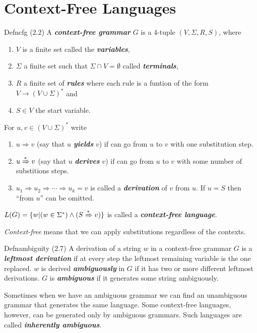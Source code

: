 \chapter{Context-Free Languages}

\begin{reference}{Defn}{cfg}
  (2.2) A \textbf{\textit{context-free grammar}} $G$ is a 4-tuple $(V,\Sigma,R,S)$, where
  \begin{enumerate}
    \item $V$ is a finite set called the \textbf{\textit{variables}},
    \item $\Sigma$ a finite set such that $\Sigma\cap V=\emptyset$ called \textbf{\textit{terminals}},
    \item $R$ a finite set of \textbf{\textit{rules}} where each rule is a funtion of the form $V\rightarrow (V\cup \Sigma)^*$ and
    \item $S\in V$ the start variable.
  \end{enumerate}
  For $u,v\in(V\cup\Sigma)^*$ write
  \begin{enumerate}
    \item $u\Rightarrow v$ (say that $u$ \textbf{\textit{yields}} $v$) if can go from $u$ to $v$ with one substitution step.
    \item $u\xRightarrow{*}v$ (say that $u$ \textbf{\textit{derives}} $v$) if can go from $u$ to $v$ with some number of substitions steps.
    \item $u_1\Rightarrow u_2\Rightarrow\cdots\Rightarrow u_k=v$ is called a \textbf{\textit{derivation}} of $v$ from $u$. If $u=S$ then ``from $u$'' can be omitted.
  \end{enumerate}
  $L(G)=\{w|(w\in \Sigma^*)\wedge (S\xRightarrow{*}v)\}$ is called a \textbf{\textit{context-free language}}.
\end{reference}

\textit{Context-free} means that we can apply substitutions regardless of the contexts.

\begin{reference}{Defn}{ambiguity}
  (2.7) A derivation of a string $w$ in a context-free grammar $G$ is a \textbf{\textit{leftmost derivation}} if at every step the leftmost remaining variable is the one replaced. $w$ is derived \textbf{\textit{ambiguously}} in $G$ if it has two or more different leftmost derivations. $G$ is \textbf{\textit{ambiguous}} if it generates some string ambiguously.
\end{reference}

Sometimes when we have an ambiguous grammar we can find an unambiguous grammar that generates the same language. Some context-free languages, however, can be generated only by ambiguous grammars. Such languages are called \textbf{\textit{inherently ambiguous}}.

